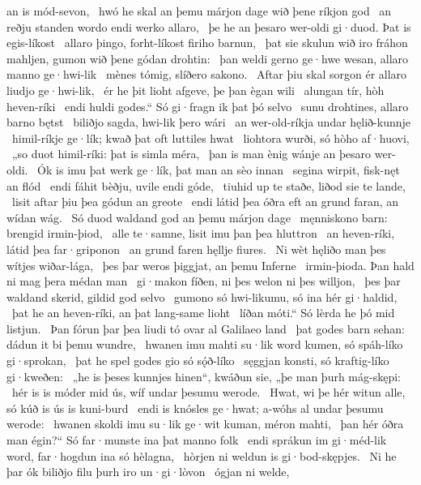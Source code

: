 an is mód-sevon, \hld\ hwó he skal an þemu márjon dage
wið þene ríkjon god \hld\ an reðju standen
wordo endi werko allaro, \hld\ þe he an þesaro wer-oldi gi·duod.
Þat is egis-líkost \hld\ allaro þingo,
forht-líkost firiho barnun, \hld\ þat sie skulun wið iro fráhon mahljen,
gumon wið þene gódan drohtin: \hld\ þan weldi gerno ge·hwe wesan,
allaro manno ge·hwi-lik \hld\ mènes tómig,
slíðero sakono. \hld\ Aftar þiu skal sorgon ér
allaro liudjo ge·hwi-lik, \hld\ ér he þit lioht afgeve,
þe þan ègan wili \hld\ alungan tír,
hòh heven-ríki \hld\ endi huldi godes.“
Só gi·fragn ik þat þó selvo \hld\ sunu drohtines,
allaro barno bętst \hld\ biliðjo sagda,
hwi-lik þero wári \hld\ an wer-old-ríkja
undar hęlið-kunnje \hld\ himil-ríkje ge·lík;
kwað þat oft luttiles hwat \hld\ liohtora wurði,
só hòho af·huovi, \hld\ „so duot himil-ríki:
þat is simla méra, \hld\ þan is man ènig
wánje an þesaro wer-oldi. \hld\ Ók is imu þat werk ge·lík,
þat man an sèo innan \hld\ segina wirpit,
fisk-nęt an flód \hld\ endi fáhit bèðju,
uvile endi góde, \hld\ tiuhid up te staðe,
liðod sie te lande, \hld\ lisit aftar þiu
þea gódun an greote \hld\ endi látid þea óðra eft an grund faran,
an wídan wág. \hld\ Só duod waldand god
an þemu márjon dage \hld\ męnniskono barn:
brengid irmin-þiod, \hld\ alle te·samne,
lisit imu þan þea hluttron \hld\ an heven-ríki,
látid þea far·griponon \hld\ an grund faren
hęllje fiures. \hld\ Ni wèt hęliðo man
þes wítjes wiðar-lága, \hld\ þes þar weros þiggjat,
an þemu Inferne \hld\ irmin-þioda.
Þan hald ni mag þera médan man \hld\ gi·makon fíðen,
ni þes welon ni þes willjon, \hld\ þes þar waldand skerid,
gildid god selvo \hld\ gumono só hwi-likumu,
só ina hér gi·haldid, \hld\ þat he an heven-ríki,
an þat lang-same lioht \hld\ líðan móti.“
Só lèrda he þó mid listjun. \hld\ Þan fórun þar þea liudi tó
ovar al Galilaeo land \hld\ þat godes barn sehan:
dádun it bi þemu wundre, \hld\ hwanen imu mahti su·lik word kumen,
só spáh-líko gi·sprokan, \hld\ þat he spel godes
gio só sǫ́ð-líko \hld\ sęggjan konsti,
só kraftig-líko gi·kweðen: \hld\ „he is þeses kunnjes hinen“, kwáðun sie,
„þe man þurh mág-skępi: \hld\ hér is is móder mid ús,
wíf undar þesumu werode. \hld\ Hwat, wi þe hér witun alle,
só kúð is ús is kuni-burd \hld\ endi is knósles ge·hwat;
a-wóhs al undar þesumu werode: \hld\ hwanen skoldi imu su·lik ge·wit kuman,
méron mahti, \hld\ þan hér óðra man égin?“
Só far·munste ina þat manno folk \hld\ endi sprákun im gi·méd-lik word,
far·hogdun ina só hèlagna, \hld\ hòrjen ni weldun
is gi·bod-skępjes. \hld\ Ni he þar ók biliðjo filu
þurh iro un·gi·lòvon \hld\ ógjan ni welde,
